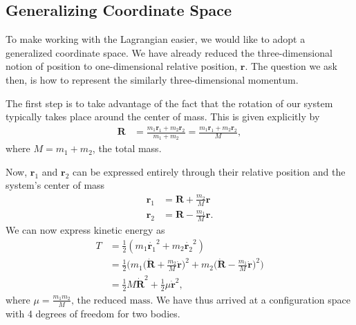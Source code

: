 \documentclass[10pt, psamsfonts]{amsart}
\theoremstyle{definition}
\theoremstyle{remark}
\numberwithin{equation}{section}
\begin{document}
\subsection{Generalizing Coordinate Space} To make working with the Lagrangian
easier, we would like to adopt a generalized coordinate space. We have already
reduced the three-dimensional notion of position to one-dimensional relative
position, $\bm{r}$. The question we ask then, is how to represent the similarly
three-dimensional momentum. 

The first step is to take advantage of the fact that the rotation of our system typically takes place around the center of mass. This is given explicitly by
\begin{align*}
  \bm{R} &= \frac{m_1 \bm{r}_1 + m_2 \bm{r}_2}{m_1 + m_2} 
         = \frac{m_1 \bm{r}_1 + m_2 \bm{r}_2}{M},
\end{align*}
where $M = m_1 + m_2$, the total mass.

\noindent Now, $\bm{r}_1$ and $\bm{r}_2$ can be expressed entirely through their relative position and the system's center of mass
\begin{align*}
  \bm{r}_1 &= \bm{R} + \frac{m_2}{M} \bm{r} \\
  \bm{r}_2 &= \bm{R} - \frac{m_1}{M} \bm{r}.
\end{align*}
\noindent We can now express kinetic energy as
\begin{align*}
  T & = \frac{1}{2} (m_1 \dot{\bm{r}_1}^2 + m_2 \dot{\bm{r}_2}^2) \\
    & = \frac{1}{2} \bigg(m_1 \bigg(\dot{\bm{R}}+\frac{m_2}{M} \dot{\bm{r}}\bigg)^2 + m_2 \bigg(\dot{\bm{R}} - \frac{m_1}{M} \dot{\bm{r}} \bigg)^2 \bigg)\\
    & = \frac{1}{2} M \dot{\bm{R}}^2 + \frac{1}{2} \mu\dot{\bm{r}}^2,
\end{align*}
where $\mu = \frac{m_1 m_2}{M} \text{, the reduced mass} $.
We have thus arrived at a configuration space with 4 degrees of freedom for two bodies.\\
\end{document}
